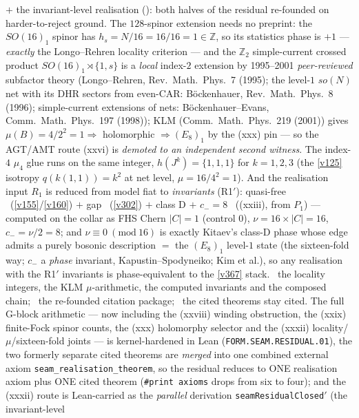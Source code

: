 \documentclass[11pt,a4paper]{article}
\newcommand{\Z}{\mathbb Z}
\begin{document}
\begin{keybox}
{$+$ the invariant-level realisation} (): both halves of the residual
re-founded on harder-to-reject ground. The $128$-spinor extension needs no preprint: the $SO(16)_1$ spinor has
$h_s{=}N/16{=}16/16{=}1{\in}\Z$, so its statistics phase is $+1$ --- \emph{exactly} the Longo--Rehren locality
criterion --- and the $\Z_2$ simple-current crossed product $SO(16)_1{\rtimes}\{1,s\}$ is a \emph{local} index-$2$
extension by 1995--2001 \emph{peer-reviewed} subfactor theory (Longo--Rehren, Rev.\ Math.\ Phys.\ 7 (1995); the
level-$1$ $so(N)$ net with its DHR sectors from even-CAR: B\"ockenhauer, Rev.\ Math.\ Phys.\ 8 (1996);
simple-current extensions of nets: B\"ockenhauer--Evans, Comm.\ Math.\ Phys.\ 197 (1998)); KLM (Comm.\ Math.\
Phys.\ 219 (2001)) gives $\mu(B){=}4/2^2{=}1\Rightarrow$ holomorphic $\Rightarrow(E_8)_1$ by the (xxx) pin ---
so the AGT/AMT route (xxvi) is \emph{demoted to an independent second witness}. The index-$4$ $\mu_4$ glue runs on
the same integer, $h(J^k){=}\{1,1,1\}$ for $k{=}1,2,3$ (the \vref{v125} isotropy $q(k(1,1)){=}k^2$ at net level,
$\mu{=}16/4^2{=}1$). And the realisation input $R_1$ is reduced from model fiat to \emph{invariants}
(R1$'$): quasi-free \mC\ (\vref{v155}/\vref{v160}) $+$ gap \mE\ (\vref{v302}) $+$ class D $+$ $c_-{=}8$ \mE\
((xxiii), from $P_1$) --- computed on the collar as FHS Chern $|C|{=}1$ (control $0$), $\nu{=}16{\times}|C|{=}16$,
$c_-{=}\nu/2{=}8$; and $\nu{\equiv}0\ (\mathrm{mod}\ 16)$ is exactly Kitaev's class-D phase whose edge admits a
purely bosonic description $=$ the $(E_8)_1$ level-$1$ state (the sixteen-fold way; $c_-$ a \emph{phase} invariant,
Kapustin--Spodyneiko; Kim et al.), so any realisation with the R1$'$ invariants is phase-equivalent to the
\vref{v367} stack. \mE\ the locality integers, the KLM $\mu$-arithmetic, the computed invariants and the composed
chain; \mC\ the re-founded citation package; \mO\ the cited theorems stay cited. The full G-block
arithmetic --- now including the (xxviii) winding obstruction, the (xxix) finite-Fock spinor counts, the (xxx)
holomorphy selector and the (xxxii) locality/$\mu$/sixteen-fold joints --- is kernel-hardened in Lean
(\texttt{FORM.SEAM.RESIDUAL.01}), the two formerly separate
cited theorems are \emph{merged} into one combined external axiom \texttt{seam\_realisation\_theorem}, so the residual
reduces to ONE realisation axiom plus ONE cited theorem (\texttt{\#print axioms} drops from six to four); and the
(xxxii) route is Lean-carried as the \emph{parallel} derivation \texttt{seamResidualClosed$'$} (the invariant-level

\end{keybox}
\end{document}
